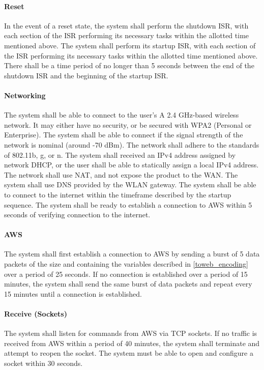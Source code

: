 \paragraph{Reset} In the event of a reset state, the system shall perform the shutdown ISR, with each section of the ISR performing its necessary tasks within the allotted time mentioned above. The system shall perform its startup ISR, with each section of the ISR performing its necessary tasks within the allotted time mentioned above. There shall be a time period of no longer than 5 seconds between the end of the shutdown ISR and the beginning of the startup ISR.

\paragraph{Networking} The system shall be able to connect to the user's A 2.4 GHz-based wireless network. It may either have no security, or be secured with WPA2 (Personal or Enterprise). The system shall be able to connect if the signal strength of the network is nominal (around -70 dBm). The network shall adhere to the standards of 802.11b, g, or n. The system shall received an IPv4 address assigned by network DHCP, or the user shall be able to statically assign a local IPv4 address. The network shall use NAT, and not expose the product to the WAN. The system shall use DNS provided by the WLAN gateway. The system shall be able to connect to the internet within the timeframe described by the startup sequence. The system shall be ready to establish a connection to AWS within 5 seconds of verifying connection to the internet.

\paragraph{AWS} The system shall first establish a connection to AWS by sending a burst of 5 data packets of the size and containing the variables described in \autoref{toweb_encoding} over a period of 25 seconds. If no connection is established over a period of 15 minutes, the system shall send the same burst of data packets and repeat every 15 minutes until a connection is established.

\paragraph{Receive (Sockets)} The system shall listen for commands from AWS via TCP sockets. If no traffic is received from AWS within a period of 40 minutes, the system shall terminate and attempt to reopen the socket. The system must be able to open and configure a socket within 30 seconds.

